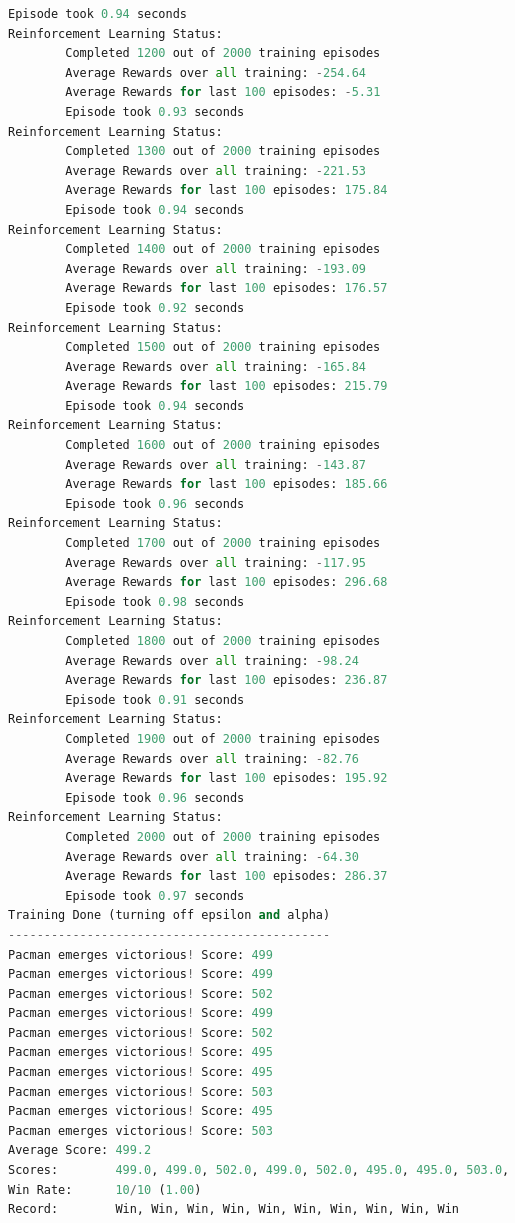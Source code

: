 \documentclass{report}
\begin{document}
\begin{lstlisting}[language=Python, caption=Q-Learning aproximado]
        Episode took 0.94 seconds
Reinforcement Learning Status:
        Completed 1200 out of 2000 training episodes
        Average Rewards over all training: -254.64
        Average Rewards for last 100 episodes: -5.31
        Episode took 0.93 seconds
Reinforcement Learning Status:
        Completed 1300 out of 2000 training episodes
        Average Rewards over all training: -221.53
        Average Rewards for last 100 episodes: 175.84
        Episode took 0.94 seconds
Reinforcement Learning Status:
        Completed 1400 out of 2000 training episodes
        Average Rewards over all training: -193.09
        Average Rewards for last 100 episodes: 176.57
        Episode took 0.92 seconds
Reinforcement Learning Status:
        Completed 1500 out of 2000 training episodes
        Average Rewards over all training: -165.84
        Average Rewards for last 100 episodes: 215.79
        Episode took 0.94 seconds
Reinforcement Learning Status:
        Completed 1600 out of 2000 training episodes
        Average Rewards over all training: -143.87
        Average Rewards for last 100 episodes: 185.66
        Episode took 0.96 seconds
Reinforcement Learning Status:
        Completed 1700 out of 2000 training episodes
        Average Rewards over all training: -117.95
        Average Rewards for last 100 episodes: 296.68
        Episode took 0.98 seconds
Reinforcement Learning Status:
        Completed 1800 out of 2000 training episodes
        Average Rewards over all training: -98.24
        Average Rewards for last 100 episodes: 236.87
        Episode took 0.91 seconds
Reinforcement Learning Status:
        Completed 1900 out of 2000 training episodes
        Average Rewards over all training: -82.76
        Average Rewards for last 100 episodes: 195.92
        Episode took 0.96 seconds
Reinforcement Learning Status:
        Completed 2000 out of 2000 training episodes
        Average Rewards over all training: -64.30
        Average Rewards for last 100 episodes: 286.37
        Episode took 0.97 seconds
Training Done (turning off epsilon and alpha)
---------------------------------------------
Pacman emerges victorious! Score: 499
Pacman emerges victorious! Score: 499
Pacman emerges victorious! Score: 502
Pacman emerges victorious! Score: 499
Pacman emerges victorious! Score: 502
Pacman emerges victorious! Score: 495
Pacman emerges victorious! Score: 495
Pacman emerges victorious! Score: 503
Pacman emerges victorious! Score: 495
Pacman emerges victorious! Score: 503
Average Score: 499.2
Scores:        499.0, 499.0, 502.0, 499.0, 502.0, 495.0, 495.0, 503.0, 495.0, 503.0
Win Rate:      10/10 (1.00)
Record:        Win, Win, Win, Win, Win, Win, Win, Win, Win, Win
\end{lstlisting}
\end{document}
